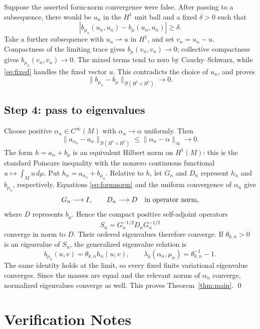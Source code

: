 \documentclass[11pt]{article}
\begin{document}
Suppose the asserted form-norm convergence were false. After passing to a
subsequence, there would be \(u_n\) in the \(H^1\) unit ball and a fixed
\(\delta>0\) such that
\[
 |b_{\mu_n}(u_n,u_n)-b_\mu(u_n,u_n)|\geq\delta.
\]
Take a further subsequence with \(u_n\rightharpoonup u\) in \(H^1\), and set
\(v_n=u_n-u\). Compactness of the limiting trace gives
\(b_\mu(v_n,v_n)\to0\); collective compactness gives
\(b_{\mu_n}(v_n,v_n)\to0\). The mixed terms tend to zero by
Cauchy--Schwarz, while \eqref{eq:fixed} handles the fixed vector \(u\). This
contradicts the choice of \(u_n\), and proves
\begin{equation}\label{eq:formnorm}
 \|b_{\mu_n}-b_\mu\|_{\mathcal B(H^1\times H^1)}\longrightarrow0.
\end{equation}

\subsection*{Step 4: pass to eigenvalues}

Choose positive \(\alpha_n\in C^\infty(M)\) with
\(\alpha_n\to\alpha\) uniformly. Then
\[
 \|a_{\alpha_n}-a_\alpha\|_{\mathcal B(H^1\times H^1)}
 \leq \|\alpha_n-\alpha\|_\infty\longrightarrow0.
\]
The form
\(h=a_\alpha+b_\mu\) is an equivalent Hilbert norm on \(H^1(M)\): this is
the standard Poincare inequality with the nonzero continuous functional
\(u\mapsto\int_Mu\,d\mu\). Put
\(h_n=a_{\alpha_n}+b_{\mu_n}\). Relative to \(h\), let \(G_n\) and \(D_n\)
represent \(h_n\) and \(b_{\mu_n}\), respectively. Equations
\eqref{eq:formnorm} and the uniform convergence of \(\alpha_n\) give
\[
 G_n\longrightarrow I,
 \qquad D_n\longrightarrow D
 \quad\hbox{in operator norm},
\]
where \(D\) represents \(b_\mu\). Hence the compact positive self-adjoint
operators
\[
 S_n=G_n^{-1/2}D_nG_n^{-1/2}
\]
converge in norm to \(D\). Their ordered eigenvalues therefore converge. If
\(\theta_{k,n}>0\) is an eigenvalue of \(S_n\), the generalized eigenvalue
relation is
\[
 b_{\mu_n}(u,v)=\theta_{k,n}h_n(u,v),
 \qquad
 \lambda_k(\alpha_n,\mu_n)=\theta_{k,n}^{-1}-1.
\]
The same identity holds at the limit, so every fixed finite variational
eigenvalue converges. Since the masses are equal and the relevant norms of
\(\alpha_n\) converge, normalized eigenvalues converge as well. This proves
Theorem~\ref{thm:main}. \qed

\section*{Verification Notes}
\end{document}
